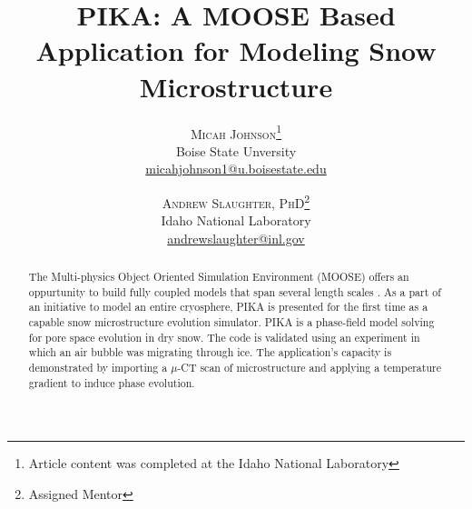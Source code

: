 \documentclass[twoside]{article}
\title{\vspace{-15mm}\fontsize{24pt}{10pt}\selectfont\textbf{PIKA: A MOOSE Based Application for Modeling Snow Microstructure}} %
\author{
\large
\textsc{Micah Johnson}\thanks{Article content was completed at the Idaho National Laboratory}\\[2mm] %
\normalsize  Boise State Unversity \\ %
\normalsize \href{mailto:micahjohnson1@u.boisestate.edu}{micahjohnson1@u.boisestate.edu} %
\vspace{-5mm}
\and
\large
\textsc{Andrew Slaughter, PhD}\thanks{Assigned Mentor}\\[2mm] %
\normalsize  Idaho National Laboratory \\ %
\normalsize \href{mailto:andrewslaughter@inl.gov}{andrewslaughter@inl.gov} %
\vspace{-5mm}
}
\date{}
\begin{document}
\maketitle %

\thispagestyle{fancy} %


\begin{abstract}
The Multi-physics Object Oriented Simulation Environment (MOOSE) offers an oppurtunity to build fully coupled models that span several length scales \cite{Gaston_2009}. As a part of an initiative to  model an entire cryosphere, PIKA is presented for the first time as a capable snow microstructure evolution simulator. PIKA is a phase-field model solving for pore space evolution in dry snow. The code is validated using an experiment in which an air bubble was migrating through ice. The application's capacity is demonstrated by importing a $\mu$-CT scan of microstructure and applying a temperature gradient to induce phase evolution. 

\end{abstract}

\end{document}
